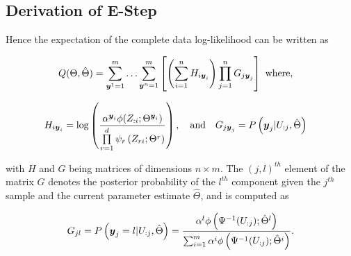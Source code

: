\documentclass{article}
\begin{document}
\subsection{Derivation of E-Step}
Hence the expectation of the complete data log-likelihood can be written as

\begin{align} \label{eq:ll_comp_expectation}
Q(\Theta,\hat{\Theta})&=\sum\limits_{\boldsymbol{y}^1=1}^m \ldots \sum\limits_{\boldsymbol{y}^n=1}^m \left[ \left( \sum\limits_{i=1}^{n}H_{i\boldsymbol{y}_i}  \right) \prod\limits_{j=1}^{n}G_{j\boldsymbol{y}_j} \right] \text{  where,}
\end{align}

\begin{align}
H_{i\boldsymbol{y}_i} &= \log \left(\frac{\alpha^{\boldsymbol{y}_i}\phi(Z_{:i}; \Theta^{\boldsymbol{y}_i})}{\prod\limits_{r=1}^{d}\psi_{r}\left(Z_{r{i}};\Theta^r \right)} \right),\quad\text{and}\quad
G_{j\boldsymbol{y}_j} = P\left(\boldsymbol{y}_j|U_{:j},\hat{\Theta}\right) \nonumber
\end{align}

with $H$ and $G$ being matrices of dimensions $n\times m$. The $(j,l)^{th}$ element of the matrix $G$ denotes the posterior probability of the $l^{th}$ component given the $j^{th}$ sample and the current parameter estimate $\hat{\Theta}$, and is computed as

\begin{align}
G_{jl}=P\left(\boldsymbol{y}_j=l|U_{:j},\hat{\Theta}\right)=\frac{\alpha^l\phi\left(\Psi^{-1}(U_{:j}); \hat{\Theta}^l\right)}{\sum_{i=1}^m\alpha^i\phi\left(\Psi^{-1}(U_{:j}); \hat{\Theta}^i\right)}.
\end{align}
\end{document}

